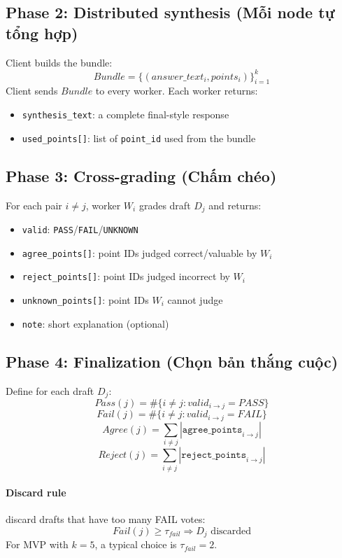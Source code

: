 \documentclass[11pt]{article}
\begin{document}
\subsection{Phase 2: Distributed synthesis (Mỗi node tự tổng hợp)}
Client builds the bundle:
\[
Bundle = \{(answer\_text_i, points_i)\}_{i=1}^{k}
\]
Client sends \(Bundle\) to every worker. Each worker returns:
\begin{itemize}[leftmargin=1.2em]
  \item \texttt{synthesis\_text}: a complete final-style response
  \item \texttt{used\_points[]}: list of \texttt{point\_id} used from the bundle
\end{itemize}

\subsection{Phase 3: Cross-grading (Chấm chéo)}
For each pair \(i \neq j\), worker \(W_i\) grades draft \(D_j\) and returns:
\begin{itemize}[leftmargin=1.2em]
  \item \texttt{valid}: \texttt{PASS}/\texttt{FAIL}/\texttt{UNKNOWN}
  \item \texttt{agree\_points[]}: point IDs judged correct/valuable by \(W_i\)
  \item \texttt{reject\_points[]}: point IDs judged incorrect by \(W_i\)
  \item \texttt{unknown\_points[]}: point IDs \(W_i\) cannot judge
  \item \texttt{note}: short explanation (optional)
\end{itemize}

\subsection{Phase 4: Finalization (Chọn bản thắng cuộc)}
Define for each draft \(D_j\):
\[
Pass(j) = \#\{i\neq j: valid_{i\rightarrow j}=PASS\}
\]
\[
Fail(j) = \#\{i\neq j: valid_{i\rightarrow j}=FAIL\}
\]
\[
Agree(j) = \sum_{i\neq j} |\texttt{agree\_points}_{i\rightarrow j}|
\]
\[
Reject(j) = \sum_{i\neq j} |\texttt{reject\_points}_{i\rightarrow j}|
\]

\paragraph{Discard rule} discard drafts that have too many FAIL votes:
\[
Fail(j) \ge \tau_{fail} \Rightarrow D_j \text{ discarded}
\]
For MVP with \(k=5\), a typical choice is \(\tau_{fail}=2\).
\end{document}
